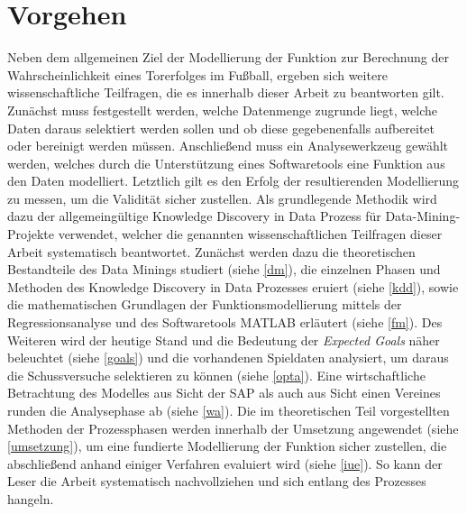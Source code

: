 \section{Vorgehen}

Neben dem allgemeinen Ziel der Modellierung der Funktion zur Berechnung der Wahrscheinlichkeit eines Torerfolges im Fußball, ergeben sich weitere wissenschaftliche Teilfragen, die es innerhalb dieser Arbeit zu beantworten gilt. Zunächst muss festgestellt werden, welche Datenmenge zugrunde liegt, welche Daten daraus selektiert werden sollen und ob diese gegebenenfalls aufbereitet oder bereinigt werden müssen. Anschließend muss ein Analysewerkzeug gewählt werden, welches durch die Unterstützung eines Softwaretools eine Funktion aus den Daten modelliert. Letztlich gilt es den Erfolg der resultierenden Modellierung zu messen, um die Validität sicher zustellen. Als grundlegende Methodik wird dazu der allgemeingültige Knowledge Discovery in Data Prozess für Data-Mining-Projekte verwendet, welcher die genannten wissenschaftlichen Teilfragen dieser Arbeit systematisch beantwortet. Zunächst werden dazu die theoretischen Bestandteile des Data Minings studiert (siehe \vref{dm}), die einzelnen Phasen und Methoden des Knowledge Discovery in Data Prozesses eruiert (siehe \vref{kdd}), sowie die mathematischen Grundlagen der Funktionsmodellierung mittels der Regressionsanalyse und des Softwaretools MATLAB erläutert (siehe \vref{fm}). Des Weiteren wird der heutige Stand und die Bedeutung der \textit{Expected Goals} näher beleuchtet (siehe \vref{goals}) und die vorhandenen Spieldaten analysiert, um daraus die Schussversuche selektieren zu können (siehe \vref{opta}). Eine wirtschaftliche Betrachtung des Modelles aus Sicht der SAP als auch aus Sicht einen Vereines runden die Analysephase ab (siehe \vref{wa}). Die im theoretischen Teil vorgestellten Methoden der Prozessphasen werden innerhalb der Umsetzung angewendet (siehe \vref{umsetzung}), um eine fundierte Modellierung der Funktion sicher zustellen, die abschließend anhand einiger Verfahren evaluiert wird (siehe \vref{iue}). So kann der Leser die Arbeit systematisch nachvollziehen und sich entlang des Prozesses hangeln.

